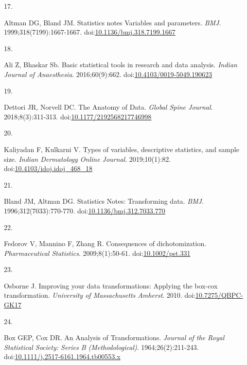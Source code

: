 \documentclass[
]{book}
\newlength{\cslhangindent}
\newlength{\csllabelwidth}
\newlength{\cslentryspacingunit} %
\newenvironment{CSLReferences}[2] %
 {%
  \setlength{\parindent}{0pt}
  \ifodd #1
  \let\oldpar\par
  \def\par{\hangindent=\cslhangindent\oldpar}
  \fi
  \setlength{\parskip}{#2\cslentryspacingunit}
 }%
 {}
\newcommand{\CSLLeftMargin}[1]{\parbox[t]{\csllabelwidth}{#1}}
\newcommand{\CSLRightInline}[1]{\parbox[t]{\linewidth - \csllabelwidth}{#1}\break}
\begin{document}
\begin{CSLReferences}{0}{0}
\leavevmode{}%
\CSLLeftMargin{17. }%
\CSLRightInline{Altman DG, Bland JM. Statistics notes Variables and parameters. \emph{BMJ}. 1999;318(7199):1667-1667. doi:\href{https://doi.org/10.1136/bmj.318.7199.1667}{10.1136/bmj.318.7199.1667}}

\leavevmode{}%
\CSLLeftMargin{18. }%
\CSLRightInline{Ali Z, Bhaskar Sb. Basic statistical tools in research and data analysis. \emph{Indian Journal of Anaesthesia}. 2016;60(9):662. doi:\href{https://doi.org/10.4103/0019-5049.190623}{10.4103/0019-5049.190623}}

\leavevmode{}%
\CSLLeftMargin{19. }%
\CSLRightInline{Dettori JR, Norvell DC. The Anatomy of Data. \emph{Global Spine Journal}. 2018;8(3):311-313. doi:\href{https://doi.org/10.1177/2192568217746998}{10.1177/2192568217746998}}

\leavevmode{}%
\CSLLeftMargin{20. }%
\CSLRightInline{Kaliyadan F, Kulkarni V. Types of variables, descriptive statistics, and sample size. \emph{Indian Dermatology Online Journal}. 2019;10(1):82. doi:\href{https://doi.org/10.4103/idoj.idoj_468_18}{10.4103/idoj.idoj\_468\_18}}

\leavevmode{}%
\CSLLeftMargin{21. }%
\CSLRightInline{Bland JM, Altman DG. Statistics Notes: Transforming data. \emph{BMJ}. 1996;312(7033):770-770. doi:\href{https://doi.org/10.1136/bmj.312.7033.770}{10.1136/bmj.312.7033.770}}

\leavevmode{}%
\CSLLeftMargin{22. }%
\CSLRightInline{Fedorov V, Mannino F, Zhang R. Consequences of dichotomization. \emph{Pharmaceutical Statistics}. 2009;8(1):50-61. doi:\href{https://doi.org/10.1002/pst.331}{10.1002/pst.331}}

\leavevmode{}%
\CSLLeftMargin{23. }%
\CSLRightInline{Osborne J. Improving your data transformations: Applying the box-cox transformation. \emph{University of Massachusetts Amherst}. 2010. doi:\href{https://doi.org/10.7275/QBPC-GK17}{10.7275/QBPC-GK17}}

\leavevmode{}%
\CSLLeftMargin{24. }%
\CSLRightInline{Box GEP, Cox DR. An Analysis of Transformations. \emph{Journal of the Royal Statistical Society: Series B (Methodological)}. 1964;26(2):211-243. doi:\href{https://doi.org/10.1111/j.2517-6161.1964.tb00553.x}{10.1111/j.2517-6161.1964.tb00553.x}}


\end{CSLReferences}
\end{document}
